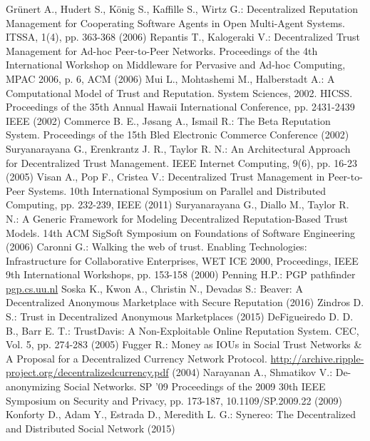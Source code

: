 \begin{thebibliography}{40}
   Gr\"unert A., Hudert S., K\"onig S., Kaffille S., Wirtz G.: Decentralized Reputation Management for Cooperating Software
   Agents in Open Multi-Agent Systems. ITSSA, 1(4), pp. 363-368 (2006)
   Repantis T., Kalogeraki V.: Decentralized Trust Management for Ad-hoc Peer-to-Peer Networks. Proceedings of the 4th
   International Workshop on Middleware for Pervasive and Ad-hoc Computing, MPAC 2006, p. 6, ACM (2006)
   Mui L., Mohtashemi M., Halberstadt A.: A Computational Model of Trust and Reputation. System Sciences, 2002. HICSS.
   Proceedings of the 35th Annual Hawaii International Conference, pp. 2431-2439 IEEE (2002)
   Commerce B. E., J\o{}sang A., Ismail R.: The Beta Reputation System. Proceedings of the 15th Bled Electronic Commerce
   Conference (2002)
   Suryanarayana G., Erenkrantz J. R., Taylor R. N.: An Architectural Approach for Decentralized Trust Management. IEEE
   Internet Computing, 9(6), pp. 16-23 (2005)
   Visan A., Pop F., Cristea V.: Decentralized Trust Management in Peer-to-Peer Systems. 10th International Symposium on
   Parallel and Distributed Computing, pp. 232-239, IEEE (2011)
   Suryanarayana G., Diallo M., Taylor R. N.: A Generic Framework for Modeling Decentralized Reputation-Based Trust Models.
   14th ACM SigSoft Symposium on Foundations of Software Engineering (2006)
   Caronni G.: Walking the web of trust. Enabling Technologies: Infrastructure for Collaborative Enterprises, WET ICE 2000,
   Proceedings, IEEE 9th International Workshops, pp. 153-158 (2000)
   Penning H.P.: PGP pathfinder \url{pgp.cs.uu.nl}
   Soska K., Kwon A., Christin N., Devadas S.: Beaver: A Decentralized Anonymous Marketplace with Secure Reputation (2016)
   Zindros D. S.: Trust in Decentralized Anonymous Marketplaces (2015)
   DeFigueiredo D. D. B., Barr E. T.: TrustDavis: A Non-Exploitable Online Reputation System. CEC, Vol. 5, pp. 274-283
   (2005)
   Fugger R.: Money as IOUs in Social Trust Networks \& A Proposal for a Decentralized Currency Network Protocol.
   \url{http://archive.ripple-project.org/decentralizedcurrency.pdf} (2004)
   Narayanan A., Shmatikov V.: De-anonymizing Social Networks. SP '09 Proceedings of the 2009 30th IEEE Symposium on
   Security and Privacy, pp. 173-187, 10.1109/SP.2009.22 (2009)
   Konforty D., Adam Y., Estrada D., Meredith L. G.: Synereo: The Decentralized and Distributed Social Network (2015)

\end{thebibliography}
